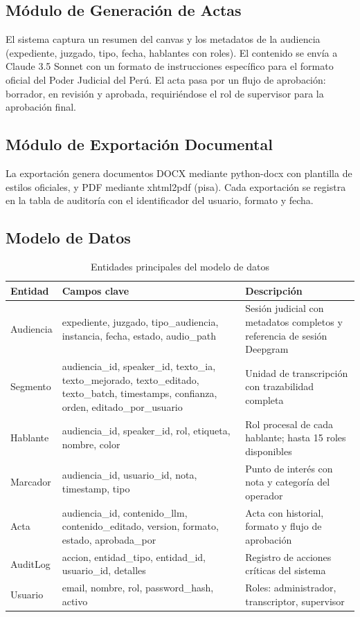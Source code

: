 \documentclass[12pt,a4paper,oneside]{report}
\begin{document}
\subsection{Módulo de Generación de Actas}

El sistema captura un resumen del canvas y los metadatos de la audiencia (expediente, juzgado, tipo, fecha, hablantes con roles). El contenido se envía a Claude 3.5 Sonnet con un formato de instrucciones específico para el formato oficial del Poder Judicial del Perú. El acta pasa por un flujo de aprobación: borrador, en revisión y aprobada, requiriéndose el rol de supervisor para la aprobación final.

\subsection{Módulo de Exportación Documental}

La exportación genera documentos DOCX mediante python-docx con plantilla de estilos oficiales, y PDF mediante xhtml2pdf (pisa). Cada exportación se registra en la tabla de auditoría con el identificador del usuario, formato y fecha.

\subsection{Modelo de Datos}

\begin{table}[H]
\centering
\small
\caption{Entidades principales del modelo de datos}
\begin{tabular}{|p{2.2cm}|p{4cm}|p{6.5cm}|}
\hline
\rowcolor{gray!20}
\textbf{Entidad} & \textbf{Campos clave} & \textbf{Descripción} \\
\hline
Audiencia & expediente, juzgado, tipo\_audiencia, instancia, fecha, estado, audio\_path & Sesión judicial con metadatos completos y referencia de sesión Deepgram \\
\hline
Segmento & audiencia\_id, speaker\_id, texto\_ia, texto\_mejorado, texto\_editado, texto\_batch, timestamps, confianza, orden, editado\_por\_usuario & Unidad de transcripción con trazabilidad completa \\
\hline
Hablante & audiencia\_id, speaker\_id, rol, etiqueta, nombre, color & Rol procesal de cada hablante; hasta 15 roles disponibles \\
\hline
Marcador & audiencia\_id, usuario\_id, nota, timestamp, tipo & Punto de interés con nota y categoría del operador \\
\hline
Acta & audiencia\_id, contenido\_llm, contenido\_editado, version, formato, estado, aprobada\_por & Acta con historial, formato y flujo de aprobación \\
\hline
AuditLog & accion, entidad\_tipo, entidad\_id, usuario\_id, detalles & Registro de acciones críticas del sistema \\
\hline
Usuario & email, nombre, rol, password\_hash, activo & Roles: administrador, transcriptor, supervisor \\
\hline
\end{tabular}
\label{tab:modelo_datos}
\end{table}
\end{document}
